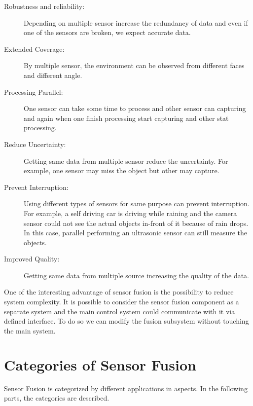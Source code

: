 \begin{description}
    \item[Robustness and reliability:] Depending on multiple sensor increase the redundancy of data and even if one of the sensors are broken, we expect accurate data.
    \item[Extended Coverage:] By multiple sensor, the environment can be observed from different faces and different angle.
    \item[Processing Parallel:] One sensor can take some time to process and other sensor can capturing and again when one finish processing start capturing and other stat processing.
    \item[Reduce Uncertainty:] Getting same data from multiple sensor reduce the uncertainty. For example, one sensor may miss the object but other may capture.
    \item[Prevent Interruption:] Using different types of sensors for same purpose can prevent interruption. For example, a self driving car is driving while raining and the camera sensor could not see the actual objects in-front of it because of rain drops. In this case, parallel performing an ultrasonic sensor can still measure the objects.
    \item[Improved Quality:] Getting same data from multiple source increasing the quality of the data.
\end{description}
One of the interesting advantage of sensor fusion is the possibility to reduce system complexity\cite{Wilfried2002}. It is possible to consider the sensor fusion component as a separate system and the main control system could communicate with it via defined interface. To do so we can modify the fusion subsystem without touching the main system\cite{Wilfried2002}.

\section{Categories of Sensor Fusion}
Sensor Fusion is categorized by different applications in aspects. In the following parts, the categories are described.

